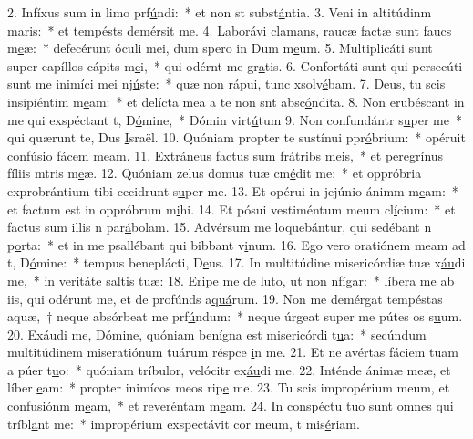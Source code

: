 2. Infíxus sum in limo prf\uline{ú}ndi:~* et non st subst\uline{á}ntia.
3. Veni in altitúdinm m\uline{a}ris:~* et tempésts dem\uline{é}rsit me.
4. Laborávi clamans, raucæ factæ sunt faucs m\uline{e}æ:~* defecérunt óculi mei, dum spero in Dum m\uline{e}um.
5. Multiplicáti sunt super capíllos cápits m\uline{e}i,~* qui odérnt me gr\uline{a}tis.
6. Confortáti sunt qui persecúti sunt me inimíci mei nj\uline{ú}ste:~* quæ non rápui, tunc xsolv\uline{é}bam.
7. Deus, tu scis insipiéntim m\uline{e}am:~* et delícta mea a te non snt absc\uline{ó}ndita.
8. Non erubéscant in me qui exspéctant t, D\uline{ó}mine,~* Dómin virt\uline{ú}tum
9. Non confundántr s\uline{u}per me~* qui quærunt te, Dus \uline{I}sraël.
10. Quóniam propter te sustínui ppr\uline{ó}brium:~* opéruit confúsio fácem m\uline{e}am.
11. Extráneus factus sum frátribs m\uline{e}is,~* et peregrínus fíliis mtris m\uline{e}æ.
12. Quóniam zelus domus tuæ cm\uline{é}dit me:~* et oppróbria exprobrántium tibi cecidrunt s\uline{u}per me.
13. Et opérui in jejúnio ánimm m\uline{e}am:~* et factum est in oppróbrum m\uline{i}hi.
14. Et pósui vestiméntum meum cl\uline{í}cium:~* et factus sum illis n par\uline{á}bolam.
15. Advérsum me loquebántur, qui sedébant n p\uline{o}rta:~* et in me psallébant qui bibbant v\uline{i}num.
16. Ego vero oratiónem meam ad t, D\uline{ó}mine:~* tempus beneplácti, D\uline{e}us.
17. In multitúdine misericórdiæ tuæ x\uline{áu}di me,~* in veritáte saltis t\uline{u}æ:
18. Eripe me de luto, ut non nf\uline{í}gar:~* líbera me ab iis, qui odérunt me, et de profúnds a\uline{quá}rum.
19. Non me demérgat tempéstas aquæ,~† neque absórbeat me prf\uline{ú}ndum:~* neque úrgeat super me pútes os s\uline{u}um.
20. Exáudi me, Dómine, quóniam benígna est misericórdi t\uline{u}a:~* secúndum multitúdinem miseratiónum tuárum réspce \uline{i}n me.
21. Et ne avértas fáciem tuam a púer t\uline{u}o:~* quóniam tríbulor, velócitr ex\uline{áu}di me.
22. Inténde ánimæ meæ, et líber \uline{e}am:~* propter inimícos meos rip\uline{e} me.
23. Tu scis impropérium meum, et confusiónm m\uline{e}am,~* et reveréntam m\uline{e}am.
24. In conspéctu tuo sunt omnes qui tríbl\uline{a}nt me:~* impropérium exspectávit cor meum, t mis\uline{é}riam.
